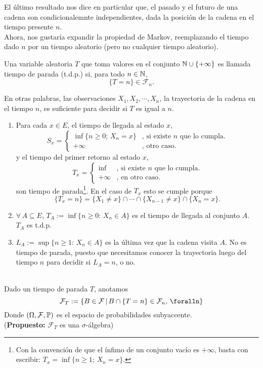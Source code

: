 El último resultado nos dice en particular que, el pasado y el futuro de una cadena son condicionalemnte independientes, dada la posición de la cadena en el tiempo presente $n$.\\ Ahora, nos gustaría expandir la propiedad de Markov, reemplazando el tiempo dado $n$ por un tiempo aleatorio (pero no cualquier tiempo aleatorio).

\begin{definicion}
Una variable aleatoria $T$ que toma valores en el conjunto $\mathbb N\cup \{+\infty\}$ es llamada tiempo de parada (t.d.p.) si, para todo $n\in \mathbb N$,
\[\{T=n\} \in \mathcal{F}_n.\]
\end{definicion}
En otras palabras, las observaciones $X_1,X_2,\cdots,X_n$, la trayectoria de la cadena en el tiempo $n$, es suficiente para decidir si $T$ es igual a $n$.

\begin{ejemplo}
    \begin{enumerate}
        \item Para cada $x\in E$, el tiempo de llegada al estado $x$,
        \[S_x = \begin{cases}
        \inf\{n\geq0;\,X_n=x\} & \text{, si existe $n$ que lo cumpla.}\\
        +\infty & \text{, otro caso.}
        \end{cases}\]
        y el tiempo del primer retorno al estado $x$,
        \[T_x = \begin{cases}
        \inf\ & \text{, si existe $n$ que lo cumpla.}\\
        +\infty & \text{, en otro caso.}
        \end{cases}\]
        son tiempo de parada\footnote{Con la convención de que el ínfimo de un conjunto vacío es $+\infty$, basta con escribir: $T_x = \inf\{n\geq 1;\,X_n=x\}$.}. En el caso de $T_x$ esto se cumple porque
        \[\{T_x = n\} = \{X_1\neq x\}\cap \cdots \cap \{X_{n-1}\neq x\}\cap\{X_n = x\}.\]
        \item $\forall\,A\subseteq E$, $T_A := \inf\{n\geq 0:\,X_n\in A\}$ es el tiempo de llegada al conjunto $A$. $T_A$ es t.d.p.
        \item $L_A:= \sup\{n\geq 1:\,X_n\in A\}$ es la última vez que  la cadena visita $A$. No es tiempo de parada, puesto que necesitamos conocer la trayectoria luego del tiempo $n$ para decidir si $L_A = n$, o no.
    \end{enumerate}
\end{ejemplo}\\ \newline \newline
Dado un tiempo de parada $T$, anotamos
\[\mathcal{F}_T := \{B \in \mathcal{F}\,|\,B\cap \{T=n\} \in \mathcal{F}_n,\, \foralln\}\]
Donde $\left(\Omega,\mathcal{F},\mathbb{P}\right)$ es el espacio de probabilidades subyaccente.\\ (\textbf{Propuesto: }$\mathcal{F}_T$ es una $\sigma$-álgebra)

